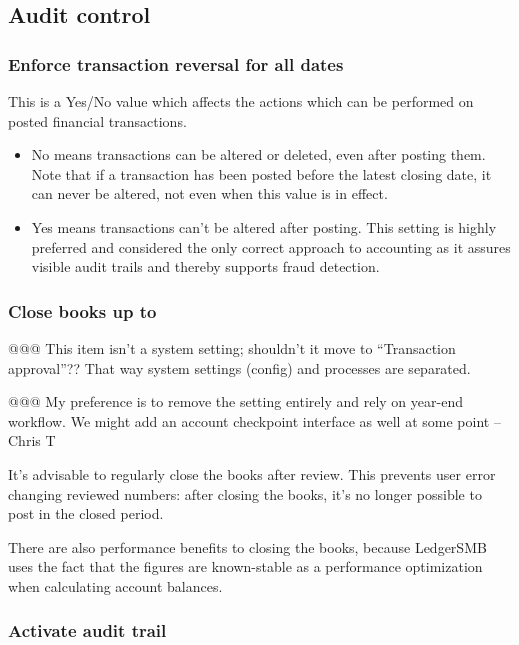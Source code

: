 \subsection{Audit control}
\label{subsec-company-config-audit-control}

\subsubsection{Enforce transaction reversal for all dates}
\label{subsubsec-company-config-audit-control-reversals}


This is a Yes/No value which affects the actions which can be performed on posted financial transactions.
\begin{itemize}
\item No means transactions can be altered or deleted, even after posting them. Note that
if a transaction has been posted before the latest closing date, it can never be altered,
not even when this value is in effect.
\item Yes means transactions can't be altered after posting. This setting is highly preferred and considered the only correct approach to accounting as it assures visible
audit trails and thereby supports fraud detection.
\end{itemize}

\subsubsection{Close books up to}
\label{subsubsec-company-config-audit-control-close-books}


@@@ This item isn't a system setting; shouldn't it move to ``Transaction approval''?? That way system settings (config) and processes are separated.

@@@ My preference is to remove the setting entirely and rely on year-end 
workflow.  We might add an account checkpoint interface as well at some point
--Chris T

It's advisable to regularly close the books after review. This prevents user error changing
reviewed numbers: after closing the books, it's no longer possible to post in the closed
period.

There are also performance benefits to closing the books, because LedgerSMB uses the
fact that the figures are known-stable as a performance optimization when calculating
account balances.

\subsubsection{Activate audit trail}
\label{subsubsec-company-config-audit-control-audit-trail}

